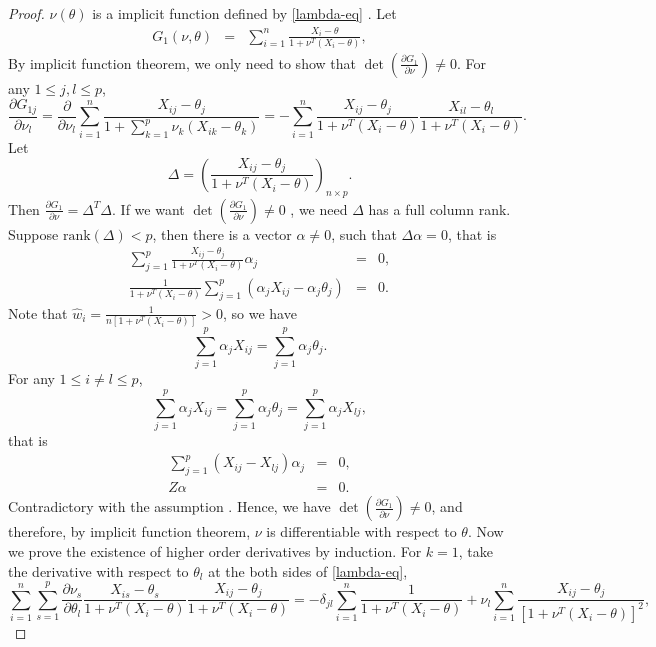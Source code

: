 \begin{proof}
$\nu\left(\theta\right)$ is a implicit function defined by \eqref{lambda-eq}
. Let 
\begin{eqnarray*}
G_{1}\left(\nu,\theta\right) & = & \sum_{i=1}^{n}\frac{X_{i}-\theta}{1+\nu^{T}\left(X_{i}-\theta\right)},
\end{eqnarray*}
By implicit function theorem, we only need to show that $\det\left(\frac{\partial G_{1}}{\partial\nu}\right)\neq0$.
For any $1\le j,l\le p$, 
\[
\frac{\partial G_{1j}}{\partial\nu_{l}}=\frac{\partial}{\partial\nu_{l}}\sum_{i=1}^{n}\frac{X_{ij}-\theta_{j}}{1+\sum_{k=1}^{p}\nu_{k}\left(X_{ik}-\theta_{k}\right)}=-\sum_{i=1}^{n}\frac{X_{ij}-\theta_{j}}{1+\nu^{T}\left(X_{i}-\theta\right)}\frac{X_{il}-\theta_{l}}{1+\nu^{T}\left(X_{i}-\theta\right)}.
\]
Let 
\[
\Delta=\left(\frac{X_{ij}-\theta_{j}}{1+\nu^{T}\left(X_{i}-\theta\right)}\right)_{n\times p}.
\]
Then $\frac{\partial G_{1}}{\partial\nu}=\Delta^{T}\Delta$. If we
want $\det\left(\frac{\partial G_{1}}{\partial\nu}\right)\neq0$ ,
we need $\Delta$ has a full column rank. Suppose $\mathrm{rank}\left(\Delta\right)<p$,
then there is a vector $\alpha\neq0$, such that $\Delta\alpha=0$,
that is 
\begin{eqnarray*}
\sum_{j=1}^{p}\frac{X_{ij}-\theta_{j}}{1+\nu^{T}\left(X_{i}-\theta\right)}\alpha_{j} & = & 0,\\
\frac{1}{1+\nu^{T}\left(X_{i}-\theta\right)}\sum_{j=1}^{p}\left(\alpha_{j}X_{ij}-\alpha_{j}\theta_{j}\right) & = & 0.
\end{eqnarray*}
Note that $\hat{w}_{i}=\frac{1}{n\left[1+\nu^{T}\left(X_{i}-\theta\right)\right]}>0$,
so we have 
\[
\sum_{j=1}^{p}\alpha_{j}X_{ij}=\sum_{j=1}^{p}\alpha_{j}\theta_{j}.
\]
For any $1\le i\neq l\le p$, 
\[
\sum_{j=1}^{p}\alpha_{j}X_{ij}=\sum_{j=1}^{p}\alpha_{j}\theta_{j}=\sum_{j=1}^{p}\alpha_{j}X_{lj},
\]
that is 
\begin{eqnarray*}
\sum_{j=1}^{p}\left(X_{ij}-X_{lj}\right)\alpha_{j} & = & 0,\\
Z\alpha & = & 0.
\end{eqnarray*}
Contradictory with the assumption .
Hence, we have $\det\left(\frac{\partial G_{1}}{\partial\nu}\right)\neq0$,
and therefore, by implicit function theorem, $\nu$ is differentiable
with respect to $\theta$. Now we prove the existence of higher order
derivatives by induction. For $k=1$, take the derivative with respect
to $\theta_{l}$ at the both sides of \eqref{lambda-eq}, 
\[
\sum_{i=1}^{n}\sum_{s=1}^{p}\frac{\partial\nu_{s}}{\partial\theta_{l}}\frac{X_{is}-\theta_{s}}{1+\nu^{T}\left(X_{i}-\theta\right)}\frac{X_{ij}-\theta_{j}}{1+\nu^{T}\left(X_{i}-\theta\right)}=-\delta_{jl}\sum_{i=1}^{n}\frac{1}{1+\nu^{T}\left(X_{i}-\theta\right)}+\nu_{l}\sum_{i=1}^{n}\frac{X_{ij}-\theta_{j}}{\left[1+\nu^{T}\left(X_{i}-\theta\right)\right]^{2}},
\]
\end{proof}
